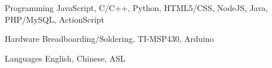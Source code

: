 


\begin{cvskills}


\cvskill
{Programming} %
{JavaScript, C/C++, Python, HTML5/CSS, NodeJS, Java,  PHP/MySQL, ActionScript} %


\cvskill
{Hardware} %
{Breadboarding/Soldering, TI-MSP430, Arduino} %


\cvskill
{Languages} %
{English, Chinese, ASL} %


\end{cvskills}